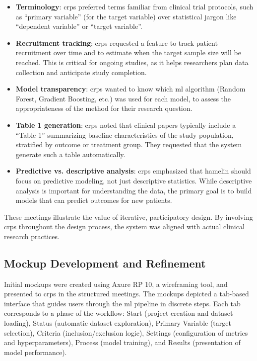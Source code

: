 \begin{itemize}  
    \item \textbf{Terminology}: \glspl{crp} preferred terms familiar from clinical trial protocols, such as ``primary variable'' (for the target variable) over statistical jargon like ``dependent variable'' or ``target variable''.  
      
    \item \textbf{Recruitment tracking}: \glspl{crp} requested a feature to track patient recruitment over time and to estimate when the target sample size will be reached. This is critical for ongoing studies, as it helps researchers plan data collection and anticipate study completion.  
      
    \item \textbf{Model transparency}: \glspl{crp} wanted to know which \gls{ml} algorithm (Random Forest, Gradient Boosting, etc.) was used for each model, to assess the appropriateness of the method for their research question.  
      
    \item \textbf{Table 1 generation}: \glspl{crp} noted that clinical papers typically include a ``Table 1'' summarizing baseline characteristics of the study population, stratified by outcome or treatment group. They requested that the system generate such a table automatically.  
      
    \item \textbf{Predictive vs. descriptive analysis}: \glspl{crp} emphasized that \gls{hamelin} should focus on predictive modeling, not just descriptive statistics. While descriptive analysis is important for understanding the data, the primary goal is to build models that can predict outcomes for new patients.  
\end{itemize}  
  
These meetings illustrate the value of iterative, participatory design. By involving \glspl{crp} throughout the design process, the system was aligned with actual clinical research practices.  
  
\subsection{Mockup Development and Refinement}  
\label{subsec:mockup_development}  
  
Initial mockups were created using Axure RP 10, a wireframing tool, and presented to \glspl{crp} in the structured meetings. The mockups depicted a tab-based interface that guides users through the \gls{ml} pipeline in discrete steps. Each tab corresponds to a phase of the workflow: Start (project creation and dataset loading), Status (automatic dataset exploration), Primary Variable (target selection), Criteria (inclusion/exclusion logic), Settings (configuration of metrics and hyperparameters), Process (model training), and Results (presentation of model performance).  
  
